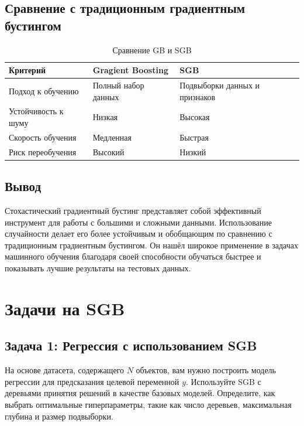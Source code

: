 \subsection{Сравнение с традиционным градиентным бустингом}

\begin{table}[h!]
    \centering
    \begin{tabular}{|l|l|l|}
        \hline
        \textbf{Критерий}   & \textbf{Gragient Boosting} & \textbf{SGB}                  \\
        \hline
        Подход к обучению   & Полный набор данных        & Подвыборки данных и признаков \\
        \hline
        Устойчивость к шуму & Низкая                     & Высокая                       \\
        \hline
        Скорость обучения   & Медленная                  & Быстрая                       \\
        \hline
        Риск переобучения   & Высокий                    & Низкий                        \\
        \hline
    \end{tabular}
    \caption{Сравнение GB и SGB}
\end{table}
\newpage
\subsection{Вывод}

Стохастический градиентный бустинг представляет собой эффективный инструмент для работы с большими и сложными данными. Использование случайности делает его более устойчивым и обобщающим по сравнению с традиционным градиентным бустингом. Он нашёл широкое применение в задачах машинного обучения благодаря своей способности обучаться быстрее и показывать лучшие результаты на тестовых данных.


\section{Задачи на SGB}

\subsection{Задача 1: Регрессия с использованием SGB}

На основе датасета, содержащего $N$ объектов, вам нужно построить модель регрессии для предсказания целевой переменной $y$. Используйте SGB с деревьями принятия решений в качестве базовых моделей. Определите, как выбрать оптимальные гиперпараметры, такие как число деревьев, максимальная глубина и размер подвыборки.

